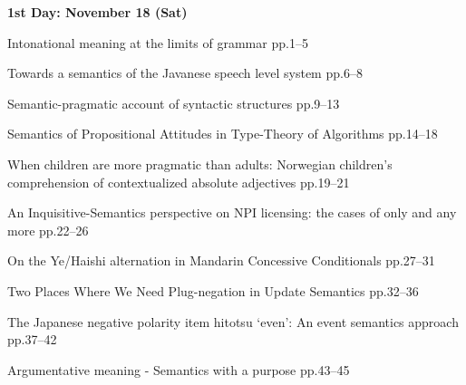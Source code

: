 \documentclass[12pt]{jarticle}
\begin{document}
\noindent\textbf{\large 
1st Day: November 18 (Sat)
}\\










  
     {Intonational meaning at the limits of grammar}
     {pp.1--5}
  
     {Towards a semantics of the Javanese speech level system}
     {pp.6--8}
  
     {Semantic-pragmatic account of syntactic structures}
     {pp.9--13}



 
  
     {Semantics of Propositional Attitudes in Type-Theory of Algorithms}
     {pp.14--18}
  
     {When children are more pragmatic than adults: Norwegian children's comprehension of contextualized absolute adjectives}
     {pp.19--21}
  
     {An Inquisitive-Semantics perspective on NPI licensing: the cases of only and any more}
     {pp.22--26}






 
  
     {On the Ye/Haishi alternation in Mandarin Concessive Conditionals}
     {pp.27--31}
  
     {Two Places Where We Need Plug-negation in Update Semantics}
     {pp.32--36}
  
     {The Japanese negative polarity item hitotsu `even': An event semantics approach}
     {pp.37--42}







  
     {Argumentative meaning - Semantics with a purpose}
     {pp.43--45}
\end{document}
